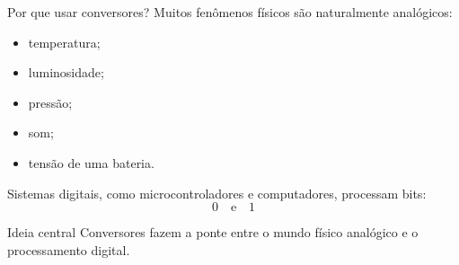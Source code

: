 \begin{frame}{Por que usar conversores?}
    Muitos fenômenos físicos são naturalmente analógicos:

    \begin{itemize}
        \item temperatura;
        \item luminosidade;
        \item pressão;
        \item som;
        \item tensão de uma bateria.
    \end{itemize}

    \vspace{0.3cm}

    Sistemas digitais, como microcontroladores e computadores, processam bits:
    \[
        0 \quad \text{e} \quad 1
    \]

    \begin{alertblock}{Ideia central}
        Conversores fazem a ponte entre o mundo físico analógico e o
        processamento digital.
    \end{alertblock}
\end{frame}
